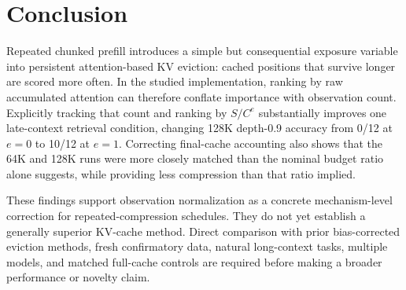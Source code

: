 \documentclass[10pt,twocolumn]{article}
\begin{document}
\section{Conclusion}
Repeated chunked prefill introduces a simple but consequential exposure variable into persistent attention-based KV eviction: cached positions that survive longer are scored more often. In the studied implementation, ranking by raw accumulated attention can therefore conflate importance with observation count. Explicitly tracking that count and ranking by $S/C^e$ substantially improves one late-context retrieval condition, changing 128K depth-0.9 accuracy from 0/12 at $e=0$ to 10/12 at $e=1$. Correcting final-cache accounting also shows that the 64K and 128K runs were more closely matched than the nominal budget ratio alone suggests, while providing less compression than that ratio implied.

These findings support observation normalization as a concrete mechanism-level correction for repeated-compression schedules. They do not yet establish a generally superior KV-cache method. Direct comparison with prior bias-corrected eviction methods, fresh confirmatory data, natural long-context tasks, multiple models, and matched full-cache controls are required before making a broader performance or novelty claim.
\end{document}
